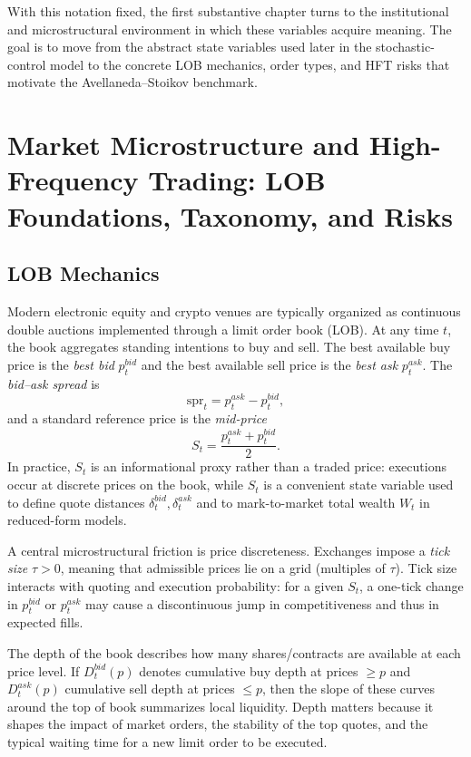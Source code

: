 With this notation fixed, the first substantive chapter turns to the institutional and microstructural environment in which these variables acquire meaning. The goal is to move from the abstract state variables used later in the stochastic-control model to the concrete LOB mechanics, order types, and HFT risks that motivate the Avellaneda--Stoikov benchmark.
\section{Market Microstructure and High-Frequency Trading: LOB Foundations, Taxonomy, and Risks}
\label{hft1-ch:microstructure_hft}


\subsection{LOB Mechanics}
Modern electronic equity and crypto venues are typically organized as continuous double auctions implemented through a limit order book (LOB). At any time $t$, the book aggregates standing intentions to buy and sell. The best available buy price is the \emph{best bid} $p_t^{bid}$ and the best available sell price is the \emph{best ask} $p_t^{ask}$. The \emph{bid--ask spread} is
\[
\mathrm{spr}_t = p_t^{ask}-p_t^{bid},
\]
and a standard reference price is the \emph{mid-price}
\[
S_t=\frac{p_t^{ask}+p_t^{bid}}{2}.
\]
In practice, $S_t$ is an informational proxy rather than a traded price: executions occur at discrete prices on the book, while $S_t$ is a convenient state variable used to define quote distances $\delta_t^{bid},\delta_t^{ask}$ and to mark-to-market total wealth $W_t$ in reduced-form models.

A central microstructural friction is price discreteness. Exchanges impose a \emph{tick size} $\tau>0$, meaning that admissible prices lie on a grid (multiples of $\tau$). Tick size interacts with quoting and execution probability: for a given $S_t$, a one-tick change in $p_t^{bid}$ or $p_t^{ask}$ may cause a discontinuous jump in competitiveness and thus in expected fills.

The depth of the book describes how many shares/contracts are available at each price level. If $D_t^{bid}(p)$ denotes cumulative buy depth at prices $\ge p$ and $D_t^{ask}(p)$ cumulative sell depth at prices $\le p$, then the slope of these curves around the top of book summarizes local liquidity. Depth matters because it shapes the impact of market orders, the stability of the top quotes, and the typical waiting time for a new limit order to be executed.


